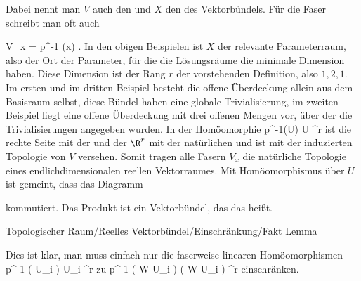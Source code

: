 Dabei nennt man $V$ auch den  {} und $X$ den  {} des Vektorbündels. Für die Faser schreibt man oft auch

\mavergleichskette
{\vergleichskette
{ V_x
}
{ = }{ p^{-1} (x)
}
{  }{
}
{    }{
}
{   }{
}
}
{}{}{.}
In den obigen Beispielen ist $X$ der relevante Parameterraum, also der Ort der Parameter, für die die Lösungsräume die minimale Dimension haben. Diese Dimension ist der Rang $r$ der vorstehenden Definition, also $1,2,1$. Im ersten und im dritten Beispiel besteht die offene Überdeckung allein aus dem Basisraum selbst, diese Bündel haben eine globale Trivialisierung, im zweiten Beispiel liegt eine offene Überdeckung mit drei offenen Mengen vor, über der die Trivialisierungen angegeben wurden.
In der Homöomorphie
\maabb {} { p^{-1}(U) } { U \times \R^r
} {}
ist die rechte Seite mit der
und der $\R^r$ mit der natürlichen
und
 ist mit der induzierten Topologie von $V$ versehen. Somit tragen alle Fasern $V_x$ die natürliche Topologie eines endlichdimensionalen reellen Vektorraumes. Mit Homöomorphismus über $U$ ist gemeint, dass das Diagramm

 {  }

kommutiert. Das Produkt
 ist ein Vektorbündel, das das  {} heißt.





{Topologischer Raum/Reelles Vektorbündel/Einschränkung/Fakt}
{Lemma}
{}
{



\faktzusatz {}
\faktzusatz {}





}
{





Dies ist klar, man muss einfach nur die faserweise linearen Homöomorphismen
 {p^{-1} \left(  U_i  \right) } { U_i \times \R^r
} {}
zu
 {p^{-1} \left(  W \cap U_i  \right) } { \left(  W \cap U_i  \right)  \times \R^r
} {}
einschränken.




}



